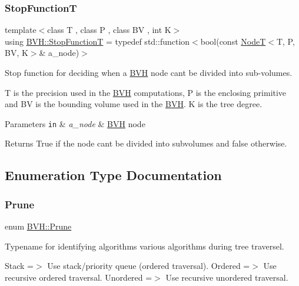 \subsubsection{\texorpdfstring{Stop\+FunctionT}{StopFunctionT}}
{\footnotesize\ttfamily template$<$class T , class P , class BV , int K$>$ \\
using \hyperlink{namespaceBVH_afef1c5979c34a11d23b756cc09654bf9}{B\+V\+H\+::\+Stop\+FunctionT} = typedef std\+::function$<$bool(const \hyperlink{classBVH_1_1NodeT}{NodeT}$<$T, P, BV, K$>$\& a\+\_\+node)$>$}



Stop function for deciding when a \hyperlink{namespaceBVH}{B\+VH} node can\textquotesingle{}t be divided into sub-\/volumes. 

T is the precision used in the \hyperlink{namespaceBVH}{B\+VH} computations, P is the enclosing primitive and BV is the bounding volume used in the \hyperlink{namespaceBVH}{B\+VH}. K is the tree degree. 
\begin{DoxyParams}[1]{Parameters}
\mbox{\tt in}  & {\em a\+\_\+node} & \hyperlink{namespaceBVH}{B\+VH} node \\
\hline
\end{DoxyParams}
\begin{DoxyReturn}{Returns}
True if the node can\textquotesingle{}t be divided into subvolumes and false otherwise. 
\end{DoxyReturn}


\subsection{Enumeration Type Documentation}
\mbox{\label{namespaceBVH_a3ddb7b34ac1deb3baed2f32d9eacbe5b}} 
\subsubsection{\texorpdfstring{Prune}{Prune}}
{\footnotesize\ttfamily enum \hyperlink{namespaceBVH_a3ddb7b34ac1deb3baed2f32d9eacbe5b}{B\+V\+H\+::\+Prune}\hspace{0.3cm}{\ttfamily [strong]}}



Typename for identifying algorithms various algorithms during tree traversel. 

Stack =$>$ Use stack/priority queue (ordered traversal). Ordered =$>$ Use recursive ordered traversal. Unordered =$>$ Use recursive unordered traversal. 
